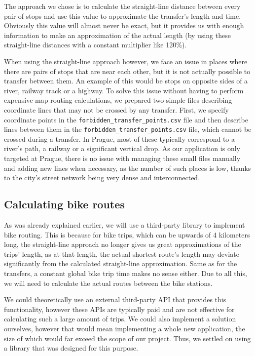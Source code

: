 The approach we chose is to calculate the straight-line distance between every pair of stops and use this value to approximate the transfer's length and time. Obviously this value will almost never be exact, but it provides us with enough information to make an approximation of the actual length (by using these straight-line distances with a constant multiplier like 120\%).

When using the straight-line approach however, we face an issue in places where there are pairs of stops that are near each other, but it is not actually possible to transfer between them. An example of this would be stops on opposite sides of a river, railway track or a highway. To solve this issue without having to perform expensive map routing calculations, we prepared two simple files describing coordinate lines that may not be crossed by any transfer. First, we specify coordinate points in the \texttt{forbidden\_transfer\_points.csv} file and then describe lines between them in the \texttt{forbidden\_transfer\_points.csv} file, which cannot be crossed during a transfer. In Prague, most of these typically correspond to a river's path, a railway or a significant vertical drop. As our application is only targeted at Prague, there is no issue with managing these small files manually and adding new lines when necessary, as the number of such places is low, thanks to the city's street network being very dense and interconnected.

\subsection{Calculating bike routes}

As was already explained earlier, we will use a third-party library to implement bike routing. This is because for bike trips, which can be upwards of 4 kilometers long, the straight-line approach no longer gives us great approximations of the trips' length, as at that length, the actual shortest route's length may deviate significantly from the calculated straight-line approximation. Same as for the transfers, a constant global bike trip time makes no sense either. Due to all this, we will need to calculate the actual routes between the bike stations. 

We could theoretically use an external third-party API that provides this functionality, however these APIs are typically paid and are not effective for calculating such a large amount of trips. We could also implement a solution ourselves, however that would mean implementing a whole new application, the size of which would far exceed the scope of our project. Thus, we settled on using a library that was designed for this purpose.

